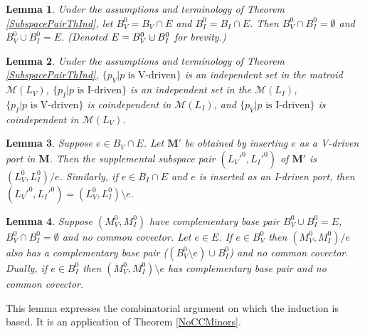 \documentclass{amsproc-sunycstr}
\theoremstyle{plain}
\newtheorem{lemma}{Lemma}[section]
\theoremstyle{definition}
\theoremstyle{remark}
\newcommand{\dunion}
{\mbox{\hbox{\hskip4pt$\cdot$\hskip-4.62pt$\cup$\hskip2pt}}}
\begin{document}
\begin{lemma}
\label{B0lemma}
Under the assumptions and terminology of Theorem \ref{SubspacePairThInd},
let $B_V^0=B_V\cap E$ and $B_I^0=B_I\cap E$.  Then 
$B_V^0\cap B_I^0=\emptyset$ and $B_V^0\cup B_I^0=E$.  (Denoted
$E=B_V^0\dunion B_I^0$ for brevity.)
\end{lemma}

\begin{lemma}
\label{PortProplemma}
Under the assumptions and terminology of Theorem \ref{SubspacePairThInd},
$\{p_V|p \mbox{\ is V-driven}\}$
is an independent set in the matroid $\mathcal{M}(L_V)$,
$\{p_I|p \mbox{\ is I-driven}\}$
is an independent set in the  $\mathcal{M}(L_I)$,
$\{p_I|p \mbox{\ is V-driven}\}$
is coindependent in $\mathcal{M}(L_I)$, and
$\{p_V|p \mbox{\ is I-driven}\}$
is coindependent in $\mathcal{M}(L_V)$.
\end{lemma}

\begin{lemma}
\label{PortInsertlemma}
Suppose $e\in B_V\cap E$. Let $\mathbf{M}'$ be obtained by inserting
$e$ as a V-driven port in $\mathbf{M}$.  Then the supplemental
subspace pair  $(L_V'^0,L_I'^0)$ of $\mathbf{M}'$ is 
$(L_V^0,L_I^0)/e$.  Similarly, if $e\in B_I\cap E$ and $e$ is inserted
as an I-driven port, then $(L_V'^0,L_I'^0)=(L_V^0,L_I^0)\setminus e$.  
\end{lemma}

\begin{lemma}
\label{TopoIndlemma}
Suppose $(M_V^0,M_I^0)$ have complementary base pair 
$B_V^0 \cup B_I^0=E$, $B_V^0 \cap B_I^0=\emptyset$ and no
common covector.  Let $e\in E$.
If $e\in B_V^0$ then $(M_V^0,M_I^0)/e$
also has a complementary base pair 
($(B_V^0\setminus e) \cup B_I^0$) and no common covector.
Dually, if $e\in B_I^0$ 
then $(M_V^0,M_I^0)\setminus e$ has complementary base pair
and no common covector.
\end{lemma}

This lemma expresses the combinatorial argument on which the 
induction is based.  It is an application of Theorem \ref{NoCCMinors}.
\end{document}
